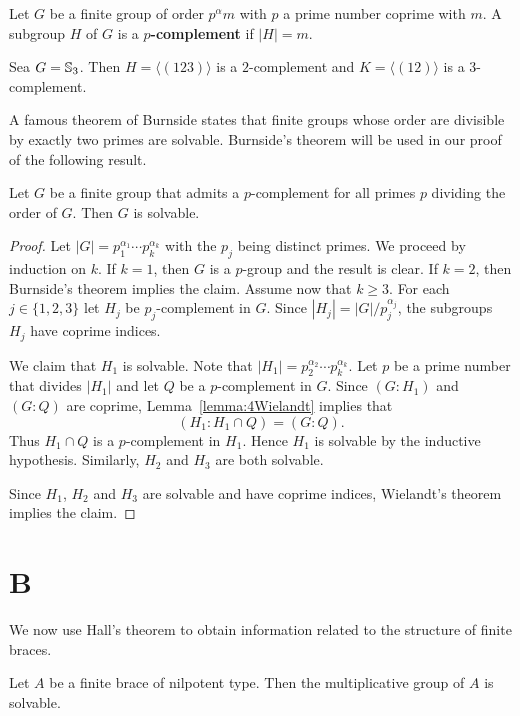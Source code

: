 Let $G$ be a finite group of order $p^{\alpha}m$ with $p$ a prime number coprime with $m$. 
A subgroup $H$ of $G$ is a \textbf{$p$-complement} if $|H|=m$. 

\begin{example}
	Sea $G=\mathbb{S}_3$. Then $H=\langle (123)\rangle$ is a $2$-complement 
	and $K=\langle (12)\rangle$ is a $3$-complement.
\end{example}

A famous theorem of Burnside states that finite groups whose order are divisible 
by exactly two primes are solvable. Burnside's theorem will be used in our proof 
of the following result. 

\begin{theorem}[Hall]
	\label{theorem:Hall:solvable}
	Let $G$ be a finite group that admits a $p$-complement for all primes
	$p$ dividing the order of $G$. Then $G$ is solvable. 
\end{theorem}

\begin{proof}
	Let $|G|=p_1^{\alpha_1}\cdots
	p_k^{\alpha_k}$ with the $p_j$ being distinct primes. We proceed by induction on 
	$k$. If $k=1$, then $G$ is a $p$-group and the result is clear. If $k=2$, then 
	Burnside's theorem implies the claim. Assume now that $k\geq3$. For each 
	$j\in\{1,2,3\}$ let $H_j$ be $p_j$-complement in
	$G$. Since $|H_j|=|G|/p_j^{\alpha_j}$, the subgroups $H_j$ have coprime indices. 
	
	We claim that $H_1$ is solvable. Note that $|H_1|=p_2^{\alpha_2}\cdots
	p_k^{\alpha_k}$. Let $p$ be a prime number that divides $|H_1|$ and let $Q$ be a 
	$p$-complement in $G$. 
	Since $(G:H_1)$ and $(G:Q)$ are coprime, Lemma~\ref{lemma:4Wielandt} implies that 
	\[
	(H_1:H_1\cap Q)=(G:Q).
	\]
	Thus $H_1\cap Q$ is a $p$-complement in $H_1$. Hence $H_1$ is
	solvable by the inductive hypothesis. Similarly, $H_2$ and 
	$H_3$ are both solvable. 
	
	Since $H_1$, $H_2$ and $H_3$ are solvable and have coprime indices, Wielandt's theorem
	implies the claim. 
\end{proof}

\section*{B}

We now use Hall's theorem to obtain information related to the
structure of finite braces. 

\begin{theorem}
\label{thm:add_nilpotent}
Let $A$ be a finite brace of nilpotent type. Then 
the multiplicative group of $A$ is solvable.
\end{theorem}

